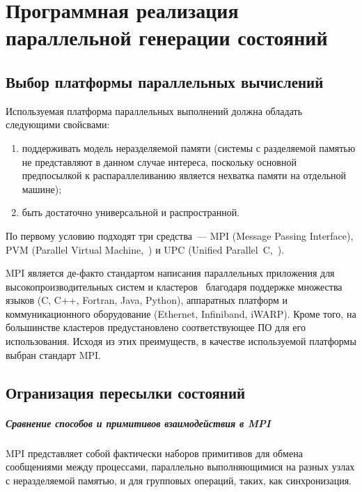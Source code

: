 \chapter{Программная реализация параллельной генерации состояний}
\label{cha:communication}

\section{Выбор платформы параллельных вычислений}
\label{sec:parall-selection}

Используемая платформа параллельных выполнений должна обладать следующими свойсвами:
\begin{enumerate}
\item поддерживать модель неразделяемой памяти (системы с разделяемой памятью не
  представляют в данном случае интереса, поскольку основной предпосылкой к
  распараллеливанию является нехватка памяти на отдельной машине);
\item быть достаточно универсальной и распространной.
\end{enumerate}

По первому условию подходят три средства~--- MPI (Message Passing Interface), PVM (Parallel
Virtual Machine,~\cite{PVM}) и UPC (Unified Parallel~C,~\cite{UPC12}).

MPI является де-факто стандартом написания параллельных приложения для
высокопроизводительных систем и кластеров~\cite{MPI} благодаря поддержке множества языков
(C, C++, Fortran, Java, Python\etc), аппаратных платформ и коммуникационного оборудование
(Ethernet, Infiniband, iWARP\etc). Кроме того, на большинстве кластеров предустановлено
соответствующее ПО для его использования. Исходя из этих преимуществ, в качестве
используемой платформы выбран стандарт MPI.

\section{Огранизация пересылки состояний}
\label{sec:mpi-interaction}

\paragraph{Сравнение способов и примитивов взаимодействия в MPI}
\label{sec:mpi-primitives}

MPI представляет собой фактически наборов примитивов для обмена сообщениями между
процессами, параллельно выполняющимися на разных узлах с неразделяемой памятью, и для
групповых операций, таких, как синхронизация.

